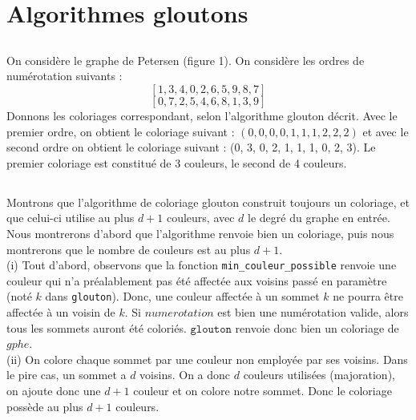 \section{Algorithmes gloutons}
\setcounter{subsection}{6}
\subsection{}
On considère le graphe de Petersen (figure 1). On considère les ordres de numérotation suivants :
$$[1, 3, 4, 0, 2, 6, 5, 9, 8, 7]$$
$$[0, 7, 2, 5, 4, 6, 8, 1, 3, 9]$$
Donnons les coloriages correspondant, selon l'algorithme glouton décrit. 
Avec le premier ordre, on obtient le coloriage suivant : 
$(0, 0, 0, 0, 1, 1, 1, 2, 2, 2)$ et avec le second ordre on obtient le coloriage suivant : (0, 3, 0, 2, 1, 1, 1, 0, 2, 3).
Le premier coloriage est constitué de 3 couleurs, le second de 4 couleurs.


\subsection{}



\subsection{}


\subsection{}
Montrons que l'algorithme de coloriage glouton construit toujours un coloriage, et que celui-ci utilise au plus $d+1$ couleurs, avec $d$ le degré du graphe en entrée.\\
Nous montrerons d'abord que l'algorithme renvoie bien un coloriage, puis nous montrerons que le nombre de couleurs est au plus $d+1$.\\
(i)
Tout d'abord, observons que la fonction \texttt{min\_couleur\_possible} renvoie une couleur qui n'a préalablement pas été affectée aux voisins passé en paramètre (noté $k$ dans \texttt{glouton}). Donc, une couleur affectée à un sommet $k$ ne pourra être affectée à un voisin de $k$. Si $numerotation$ est bien une numérotation valide, alors tous les sommets auront été coloriés. $\texttt{glouton}$ renvoie donc bien un coloriage de $gphe$.\\
(ii)
On colore chaque sommet par une couleur non employée par ses voisins. Dans le pire cas, un sommet a $d$ voisins. On a donc $d$ couleurs utilisées (majoration), on ajoute donc une $d+1$ couleur et on colore notre sommet. Donc le coloriage possède au plus $d+1$ couleurs.

